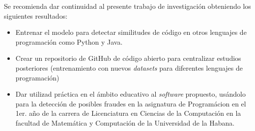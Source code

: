 \begin{recomendations}

Se recomienda dar continuidad al presente trabajo de investigación obteniendo los siguientes resultados:
\begin{itemize}
\item Entrenar el modelo para detectar similitudes de código en otros lenguajes de programación como Python y Java.

\item Crear un repositorio de GitHub de código abierto para centralizar estudios posteriores (entrenamiento con nuevos \textit{datasets} para diferentes lenguajes de programación)

\item Dar utilizad práctica en el ámbito educativo al \textit{software} propuesto, usándolo para la detección de posibles fraudes en la asignatura de Programácion en el 1er. año de la carrera de Licenciatura en Ciencias de la Computación en la facultad de Matemática y Computación de la Universidad de la Habana.
\end{itemize}

\end{recomendations}


